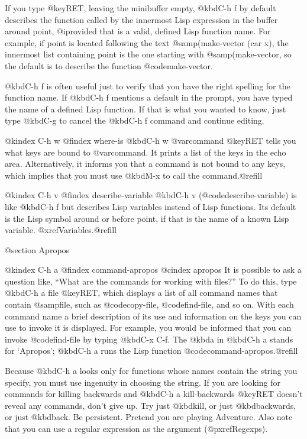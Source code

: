 {{If you type @key{RET}, leaving the minibuffer empty, @kbd{C-h f} by
default describes the function called by the innermost Lisp expression
in the buffer around point, @i{provided} that is a valid, defined Lisp
function name.  For example, if point is located following the text
@samp{(make-vector (car x)}, the innermost list containing point is the
one starting with @samp{(make-vector}, so the default is to describe
the function @code{make-vector}.

  @kbd{C-h f} is often useful just to verify that you have the right
spelling for the function name.  If @kbd{C-h f} mentions a default in the
prompt, you have typed the name of a defined Lisp function.  If that is
what you wanted to know, just type @kbd{C-g} to cancel the @kbd{C-h f}
command and continue editing.

@kindex C-h w
@findex where-is
  @kbd{C-h w @var{command} @key{RET}} tells you what keys are bound to
@var{command}.  It prints a list of the keys in the echo area.
Alternatively, it informs you that a command is not bound to any keys, which
implies that you must use @kbd{M-x} to call the command.@refill

@kindex C-h v
@findex describe-variable
  @kbd{C-h v} (@code{describe-variable}) is like @kbd{C-h f} but
describes Lisp variables instead of Lisp functions.  Its default is the
Lisp symbol around or before point, if that is the name of a known Lisp
variable.  @xref{Variables}.@refill

@section Apropos

@kindex C-h a
@findex command-apropos
@cindex apropos
  It is possible to ask a question like, ``What are the commands for
working with files?''  To do this, type @kbd{C-h a file @key{RET}},
which displays a list of all command names that contain @samp{file},
such as @code{copy-file}, @code{find-file}, and so on.  With each
command name a brief description of its use and information on the keys
you can use to invoke it is displayed.  For example, you would be
informed that you can invoke @code{find-file} by typing @kbd{C-x C-f}.
The @kbd{a} in @kbd{C-h a} stands for `Apropos'; @kbd{C-h a} runs the
Lisp function @code{command-apropos}.@refill

  Because @kbd{C-h a} looks only for functions whose names contain the
string you specify, you must use ingenuity in choosing the string.  If
you are looking for commands for killing backwards and @kbd{C-h a
kill-backwards @key{RET}} doesn't reveal any commands, don't give up.
Try just @kbd{kill}, or just @kbd{backwards}, or just @kbd{back}.  Be
persistent.  Pretend you are playing Adventure.  Also note that you can
use a regular expression as the argument (@pxref{Regexps}).

}}
